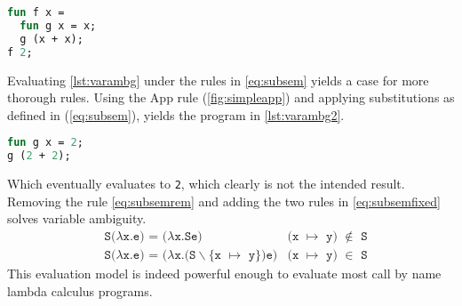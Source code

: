 \documentclass[11pt,oneside,a4paper]{report}
\begin{document}
\begin{lstlisting}[language=ML,caption={Program with variable ambiguity},label={lst:varambg},mathescape=true]
fun f x =
  fun g x = x;
  g (x + x);
f 2;
\end{lstlisting}
Evaluating \autoref{lst:varambg} under the rules in \autoref{eq:subsem} yields a case for more thorough rules.
Using the App rule (\autoref{fig:simpleapp}) and applying substitutions as defined in (\autoref{eq:subsem}), yields the program in \autoref{lst:varambg2}.
\begin{lstlisting}[language=ML,caption={Program with variable ambiguity after one reduction pass},label={lst:varambg2},mathescape=true]
fun g x = 2;
g (2 + 2);
\end{lstlisting}
Which eventually evaluates to \texttt{2}, which clearly is not the intended result.
Removing the rule \autoref{eq:subsemrem} and adding the two rules in \autoref{eq:subsemfixed} solves variable ambiguity.
\begin{align}
  &\texttt{S($\lambda$x.e) = ($\lambda$x.Se)} & \texttt{(x $\mapsto$ y) $\notin$ S} \label{eq:subsemfixed}\\
  &\texttt{S($\lambda$x.e) = ($\lambda$x.(S$\backslash$\{x $\mapsto$ y\})e)} & \texttt{(x $\mapsto$ y) $\in$ S} \tag*{}
\end{align}
This evaluation model is indeed powerful enough to evaluate most call by name lambda calculus programs.
\end{document}
